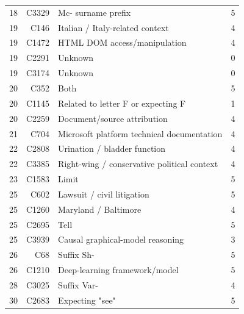 \begin{tabular}{@{}rrp{}r@{}}
  18 & C3329 & Mc- surname prefix & 5 \\
  19 & C146 & Italian / Italy-related context & 4 \\
  19 & C1472 & HTML DOM access/manipulation & 4 \\
  19 & C2291 & Unknown & 0 \\
  19 & C3174 & Unknown & 0 \\
  20 & C352 & Both & 5 \\
  20 & C1145 & Related to letter F or expecting F & 1 \\
  20 & C2259 & Document/source attribution & 4 \\
  21 & C704 & Microsoft platform technical documentation & 4 \\
  22 & C2808 & Urination / bladder function & 4 \\
  22 & C3385 & Right-wing / conservative political context & 4 \\
  23 & C1583 & Limit & 5 \\
  25 & C602 & Lawsuit / civil litigation & 5 \\
  25 & C1260 & Maryland / Baltimore & 4 \\
  25 & C2695 & Tell & 5 \\
  25 & C3939 & Causal graphical-model reasoning & 3 \\
  26 & C68 & Suffix Sh- & 5 \\
  26 & C1210 & Deep-learning framework/model & 5 \\
  28 & C3025 & Suffix Var- & 4 \\
  30 & C2683 & Expecting "see" & 5 \\
  \bottomrule
\end{tabular}
